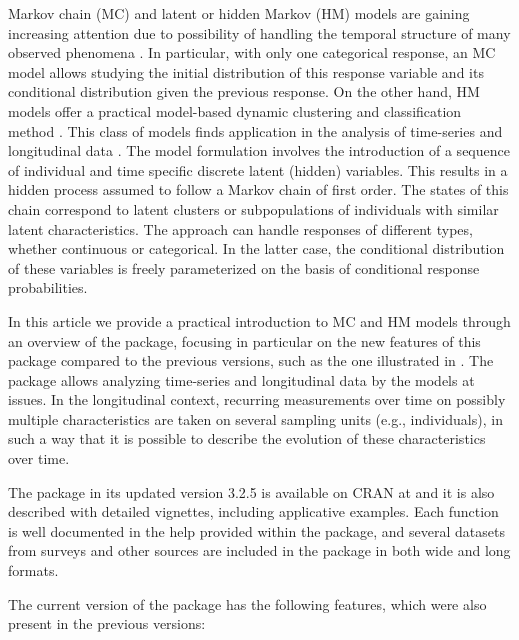 Markov chain (MC) and latent or hidden Markov (HM) models are gaining
increasing attention due to possibility of handling the temporal
structure of many observed phenomena \citep{meyn2012, mor:etal:21}. In
particular, with only one categorical response, an MC model allows
studying the initial distribution of this response variable and its
conditional distribution given the previous response. On the other hand,
HM models offer a practical model-based dynamic clustering and
classification method \citep{bou:et:al:19}. This class of models finds
application in the analysis of time-series \citep{ephr:02, Zucchini2016}
and longitudinal data
\citep{wigg:73, bart:farc:penn:13, bart:pand:penn:22}. The model
formulation involves the introduction of a sequence of individual and
time specific discrete latent (hidden) variables. This results in a
hidden process assumed to follow a Markov chain of first order. The
states of this chain correspond to latent clusters or subpopulations of
individuals with similar latent characteristics. The approach can handle
responses of different types, whether continuous or categorical. In the
latter case, the conditional distribution of these variables is freely
parameterized on the basis of conditional response probabilities.

In this article we provide a practical introduction to MC and HM models
through an overview of the  package, focusing in
particular on the new features of this package compared to the previous
versions, such as the one illustrated in \cite{bart:pand:penn:17}. The
package allows analyzing time-series and longitudinal data by the models
at issues. In the longitudinal context, recurring measurements over time on possibly multiple characteristics are taken on several sampling units (e.g., individuals), in such a way that it is possible to describe the evolution of these characteristics over time.

The package in its updated version 3.2.5 is available
on CRAN at  and it is also described with detailed
vignettes, including applicative examples. Each function is well
documented in the help provided within the package, and several datasets
from surveys and other sources are included in the package in both wide
and long formats.

The current version of the package has the following features, which
were also present in the previous versions:

